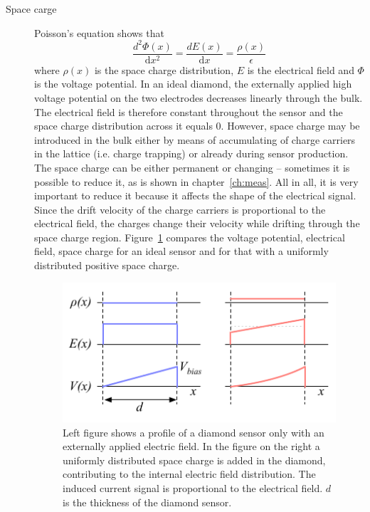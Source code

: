 \begin{description}
\item[Space carge] 
Poisson's equation shows that 
\begin{equation}
\label{eq:poisson}
\frac{d^2\Phi(x)}{\mathrm{d}x^2} = \frac{dE(x)}{\mathrm{d}x} = \frac{\rho(x)}{\epsilon}
\end{equation}
where $\rho(x)$ is the space charge distribution, $E$ is the electrical field and $\Phi$ is the voltage potential. In an ideal diamond, the externally applied high voltage potential on the two electrodes decreases linearly through the bulk. The electrical field is therefore constant throughout the sensor and the space charge distribution across it equals 0. However, space charge may be introduced in the bulk either by means of accumulating of charge carriers in the lattice (i.e. charge trapping) or already during sensor production. The space charge can be either permanent or changing -- sometimes it is possible to reduce it, as is shown in chapter~\ref{ch:meas}. All in all, it is very important to reduce it because it affects the shape of the electrical signal. Since the drift velocity of the charge carriers is proportional to the electrical field, the charges change their velocity while drifting through the space charge region. Figure~\ref{fig:spcchg} compares the voltage potential, electrical field, space charge for an ideal sensor and for that with a uniformly distributed positive space charge.
\begin{figure}[!t]
\begin{center}
\includegraphics[width=0.6\linewidth]{02_pulse_formation/pics/plots/spcchg}
\caption{Left figure shows a profile of a diamond sensor only with an externally applied electric field. In the figure on the right a uniformly distributed space charge is added in the diamond, contributing to  the internal electric field distribution. The induced current signal is proportional to the electrical field. $d$ is the thickness of the diamond sensor.}
\label{fig:spcchg}
\end{center}
\end{figure}



\end{description}
